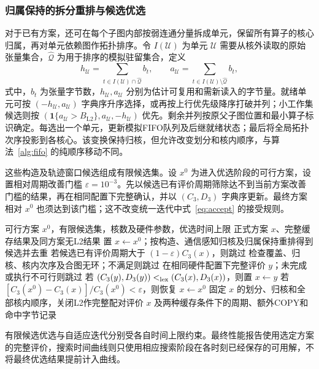\subsubsection{归属保持的拆分重排与候选优选}
\label{subsec:q3_selection}
对于已有方案，还可在每个子图内部按弱连通分量拆成单元，保留所有算子的核心归属，再对单元依赖图作拓扑排序。令 $I(\mathcal U)$ 为单元 $\mathcal U$ 需要从核外读取的原始张量集合，$\widehat{\mathcal Q}$ 为用于排序的模拟驻留集合，定义
\begin{equation}
 h_{\mathcal U}=\sum_{t\in I(\mathcal U)\cap\widehat{\mathcal Q}}b_t,\qquad
 a_{\mathcal U}=\sum_{t\in I(\mathcal U)\setminus\widehat{\mathcal Q}}b_t,
 \label{eq:q3_unit_bytes}
\end{equation}
\noindent 式中，$b_t$ 为张量字节数，$h_{\mathcal U},a_{\mathcal U}$ 分别为估计可复用和需新读入的字节量。就绪单元可按 $(-h_{\mathcal U},a_{\mathcal U})$ 字典序升序选择，或再按上行优先级降序打破并列；小工作集候选则按 $(\mathbf1\{a_{\mathcal U}>B_{\mathrm{L2}}\},a_{\mathcal U},-h_{\mathcal U})$ 优先。剩余并列按原父子图位置和最小算子标识确定。每选出一个单元，更新模拟FIFO队列及后继就绪状态；最后将全局拓扑次序投影到各核心。该变换保持归核，但允许改变划分和核内顺序，与算法~\ref{alg:fifo} 的纯顺序移动不同。

这些构造及轨迹窗口候选组成有限候选集。设 $x^0$ 为进入优选阶段的可行方案，设置相对周期改善门槛 $\varepsilon=10^{-3}$。先以候选已有评价周期筛除达不到当前方案改善门槛的结果，再在相同配置下完整确认，并以 $(C_3,D_3)$ 字典序更新。最终方案相对 $x^0$ 也须达到该门槛；这不改变统一迭代中式~\eqref{eq:accept} 的接受规则。
\begin{algorithm}[htbp]
\caption{第三问的多尺度候选优选与同方案配对}\label{alg:q3_portfolio}
\small
\begin{algorithmic}[1]
\Require 可行方案 $x^0$，有限候选集，核数及硬件参数，优选时间上限
\Ensure 正式方案 $x$、完整缓存结果及同方案无L2结果
\State 置 $x\gets x^0$；按构造、通信感知归核及归属保持重排得到候选并去重
 \State 若候选已有评价周期大于 $(1-\varepsilon)C_3(x)$，则跳过
 \State 检查覆盖、归核、核内次序及合图无环；不满足则跳过
 \State 在相同硬件配置下完整评价 $y$；未完成或执行不可行则跳过
 \State 若 $(C_3(y),D_3(y))<_{\rm lex}(C_3(x),D_3(x))$，则置 $x\gets y$
\EndFor
\State 若 $[C_3(x^0)-C_3(x)]/C_3(x^0)<\varepsilon$，则恢复 $x\gets x^0$
\State 固定 $x$ 的划分、归核和全部核内顺序，关闭L2作完整配对评价
\State \Return $x$ 及两种缓存条件下的周期、额外COPY和命中字节记录
\end{algorithmic}
\end{algorithm}

有限候选优选与自适应迭代分别受各自时间上限约束。最终性能报告使用选定方案的完整评价，搜索时间曲线则只使用相应搜索阶段在各时刻已经保存的可用解，不将最终优选结果提前计入曲线。
